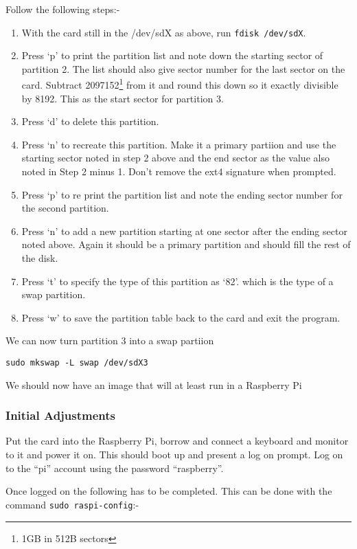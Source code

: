 \documentclass[Draft]{akc}
\begin{document}
Follow the following steps:-
\begin{enumerate}
\item With the card still in the /dev/sdX as above, run \texttt{fdisk /dev/sdX}.
\item Press `p' to print the partition list and note down the starting sector of partition 2.  The
list should also give sector number for the last sector on the card. Subtract 2097152\footnote{1GB
in 512B sectors} from it and round this down so it exactly divisible by 8192. This as the start sector
for partition 3.
\item Press `d' to delete this partition.
\item Press `n' to recreate this partition.  Make it a primary partiion and use the starting sector
noted in step 2 above and the end sector as the value also noted in Step 2 minus 1. Don't remove the
ext4 signature when prompted.
\item Press `p' to re print the partition list and note the ending sector number for the second partition.
\item Press `n' to add a new partition starting at one sector after the ending sector noted above.
Again it should be a primary partition and should fill the rest of the disk.
\item Press `t' to specify the type of this partition as `82'. which is the type of a swap partition.
\item Press `w' to save the partition table back to the card and exit the program.
\end{enumerate}

We can now turn partition 3 into a swap partiion
\begin{lstlisting}
sudo mkswap -L swap /dev/sdX3
\end{lstlisting}

We should now have an image that will at least run in a Raspberry Pi

\subsubsection{Initial Adjustments}

Put the card into the Raspberry Pi, borrow and connect a keyboard and monitor to it and power it on.  This
should boot up and present a log on prompt. Log on to the ``pi'' account using the password ``raspberry''.

Once logged on the following has to be completed. This can be done with the command \texttt{sudo
raspi-config}:-
\end{document}
